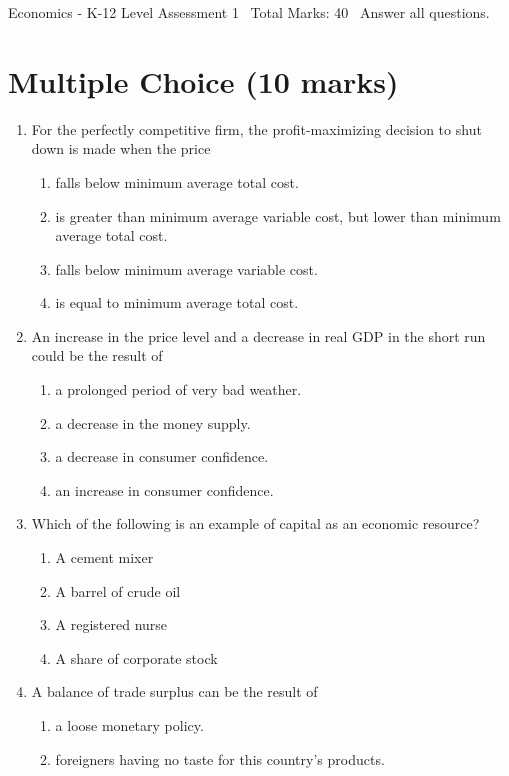 \documentclass[12pt]{article}
\begin{document}
\begin{center}
Economics - K-12 Level Assessment 1 \
Total Marks: 40 \
Answer all questions.
\end{center}

\section*{Multiple Choice (10 marks)}
\begin{enumerate}[label=\arabic*.]
\item For the perfectly competitive firm, the profit-maximizing decision to shut down is made when the price
\begin{enumerate}[label=(\alph*)]
    \item falls below minimum average total cost.
    \item is greater than minimum average variable cost, but lower than minimum average total cost.
    \item falls below minimum average variable cost.
    \item is equal to minimum average total cost.
\end{enumerate}
\item An increase in the price level and a decrease in real GDP in the short run could be the result of
\begin{enumerate}[label=(\alph*)]
    \item a prolonged period of very bad weather.
    \item a decrease in the money supply.
    \item a decrease in consumer confidence.
    \item an increase in consumer confidence.
\end{enumerate}
\item Which of the following is an example of capital as an economic resource?
\begin{enumerate}[label=(\alph*)]
    \item A cement mixer
    \item A barrel of crude oil
    \item A registered nurse
    \item A share of corporate stock
\end{enumerate}
\item A balance of trade surplus can be the result of
\begin{enumerate}[label=(\alph*)]
    \item a loose monetary policy.
    \item foreigners having no taste for this country's products.

\end{enumerate}
\end{enumerate}
\end{document}
